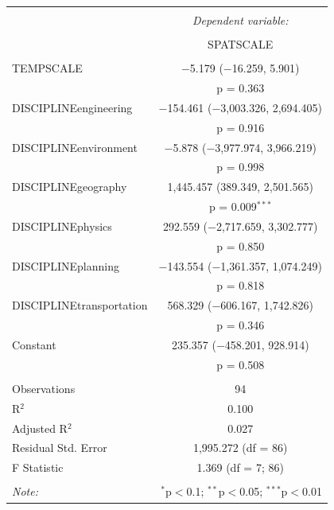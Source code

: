 \begin{table}[!htbp] \centering 
  \appcaption{}{}
\begin{tabular}{@{\extracolsep{5pt}}lc} 
\\[-1.8ex]\hline 
\hline \\[-1.8ex] 
 & \multicolumn{1}{c}{\textit{Dependent variable:}} \\ 
\cline{2-2} 
\\[-1.8ex] & SPATSCALE \\ 
\hline \\[-1.8ex] 
 TEMPSCALE & $-$5.179 ($-$16.259, 5.901) \\ 
  & p = 0.363 \\ 
  DISCIPLINEengineering & $-$154.461 ($-$3,003.326, 2,694.405) \\ 
  & p = 0.916 \\ 
  DISCIPLINEenvironment & $-$5.878 ($-$3,977.974, 3,966.219) \\ 
  & p = 0.998 \\ 
  DISCIPLINEgeography & 1,445.457 (389.349, 2,501.565) \\ 
  & p = 0.009$^{***}$ \\ 
  DISCIPLINEphysics & 292.559 ($-$2,717.659, 3,302.777) \\ 
  & p = 0.850 \\ 
  DISCIPLINEplanning & $-$143.554 ($-$1,361.357, 1,074.249) \\ 
  & p = 0.818 \\ 
  DISCIPLINEtransportation & 568.329 ($-$606.167, 1,742.826) \\ 
  & p = 0.346 \\ 
  Constant & 235.357 ($-$458.201, 928.914) \\ 
  & p = 0.508 \\ 
 \hline \\[-1.8ex] 
Observations & 94 \\ 
R$^{2}$ & 0.100 \\ 
Adjusted R$^{2}$ & 0.027 \\ 
Residual Std. Error & 1,995.272 (df = 86) \\ 
F Statistic & 1.369 (df = 7; 86) \\ 
\hline 
\hline \\[-1.8ex] 
\textit{Note:}  & \multicolumn{1}{r}{$^{*}$p$<$0.1; $^{**}$p$<$0.05; $^{***}$p$<$0.01} \\ 
\end{tabular} 
\end{table} 



